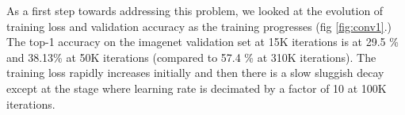 \documentclass[runningheads]{llncs}
\begin{document}
As a first step towards addressing this problem, we looked at the evolution of training loss and validation accuracy as the training progresses (fig \ref{fig:conv1}.) The top-1 accuracy on the imagenet validation set at 15K iterations is at 29.5 \% and 38.13\% at 50K iterations (compared to 57.4 \% at 310K iterations). The training loss rapidly increases initially and then there is a slow sluggish decay except at the stage where learning rate is decimated by a factor of 10 at 100K iterations.

\begin{figure}[t!]
\centering
{} \hspace{2mm}
 \hspace{2mm}

\end{figure}
\end{document}

